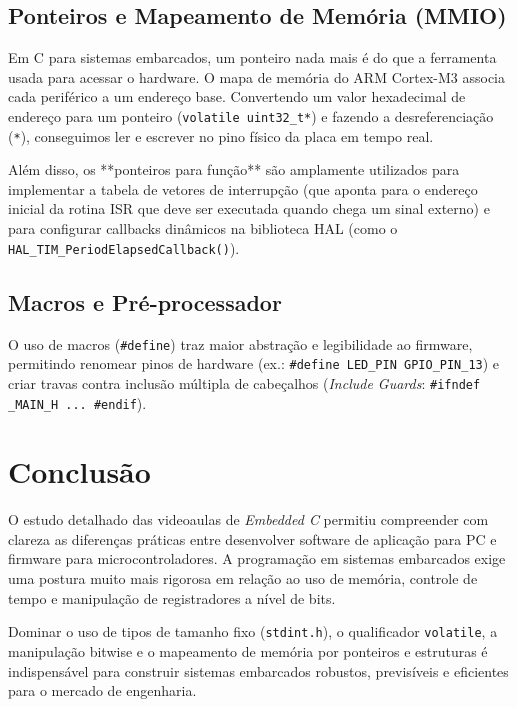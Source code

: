 \documentclass[12pt, a4paper]{article}
\begin{document}
\subsection{Ponteiros e Mapeamento de Memória (MMIO)}
\hspace*{1.25cm}Em C para sistemas embarcados, um ponteiro nada mais é do que a ferramenta usada para acessar o hardware. O mapa de memória do ARM Cortex-M3 associa cada periférico a um endereço base. Convertendo um valor hexadecimal de endereço para um ponteiro (\texttt{volatile uint32\_t*}) e fazendo a desreferenciação (\texttt{*}), conseguimos ler e escrever no pino físico da placa em tempo real.

Além disso, os **ponteiros para função** são amplamente utilizados para implementar a tabela de vetores de interrupção (que aponta para o endereço inicial da rotina ISR que deve ser executada quando chega um sinal externo) e para configurar callbacks dinâmicos na biblioteca HAL (como o \texttt{HAL\_TIM\_PeriodElapsedCallback()}).

\subsection{Macros e Pré-processador}
\hspace*{1.25cm}O uso de macros (\texttt{\#define}) traz maior abstração e legibilidade ao firmware, permitindo renomear pinos de hardware (ex.: \texttt{\#define LED\_PIN GPIO\_PIN\_13}) e criar travas contra inclusão múltipla de cabeçalhos (\textit{Include Guards}: \texttt{\#ifndef \_MAIN\_H ... \#endif}).

\section{Conclusão}
\hspace*{1.25cm}O estudo detalhado das videoaulas de \textit{Embedded C} permitiu compreender com clareza as diferenças práticas entre desenvolver software de aplicação para PC e firmware para microcontroladores. A programação em sistemas embarcados exige uma postura muito mais rigorosa em relação ao uso de memória, controle de tempo e manipulação de registradores a nível de bits.

Dominar o uso de tipos de tamanho fixo (\texttt{stdint.h}), o qualificador \texttt{volatile}, a manipulação bitwise e o mapeamento de memória por ponteiros e estruturas é indispensável para construir sistemas embarcados robustos, previsíveis e eficientes para o mercado de engenharia.
\end{document}

